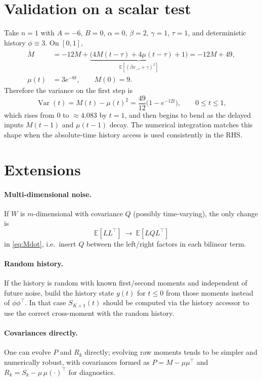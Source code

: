 \documentclass[11pt]{article}
\begin{document}
\section{Validation on a scalar test}
Take $n=1$ with
$A=-6$, $B=0$, $\alpha=0$, $\beta=2$, $\gamma=1$, $\tau=1$, and deterministic history $\phi\equiv 3$.
On $[0,1]$,
\begin{align*}
  \dot M &= -12 M + \underbrace{\big(4M(t-\tau)+4\mu(t-\tau)+1\big)}_{\mathbb{E}[(\beta x_{-\tau}+\gamma)^2]}
          = -12M + 49,\\
  \mu(t) &= 3 e^{-6t}, \qquad M(0)=9.
\end{align*}
Therefore the variance on the first step is
\begin{equation*}
  \operatorname{Var}(t)=M(t)-\mu(t)^2=\frac{49}{12}\big(1-e^{-12t}\big),\qquad 0\le t\le 1,
\end{equation*}
which rises from $0$ to $\approx 4.083$ by $t=1$, and then begins to bend as the delayed inputs $M(t-1)$ and $\mu(t-1)$ decay. The numerical integration matches this shape when the absolute-time history access is used consistently in the RHS.

\section{Extensions}
\paragraph{Multi-dimensional noise.}
If $W$ is $m$-dimensional with covariance $Q$ (possibly time-varying), the only change is
\begin{equation*}
  \mathbb{E}[L L^\top]\ \longrightarrow\ \mathbb{E}[L Q L^\top]
\end{equation*}
in \eqref{eq:Mdot}, i.e.\ insert $Q$ between the left/right factors in each bilinear term.

\paragraph{Random history.}
If the history is random with known first/second moments and independent of future noise, build the history state $y(t)$ for $t\le0$ from those moments instead of $\phi\phi^\top$. In that case $S_{K+1}(t)$ should be computed via the history accessor to use the correct cross-moment with the random history.

\paragraph{Covariances directly.}
One can evolve $P$ and $R_k$ directly; evolving raw moments tends to be simpler and numerically robust, with covariances formed as $P=M-\mu\mu^\top$ and $R_k=S_k-\mu\,\mu(\cdot)^\top$ for diagnostics.
\end{document}
